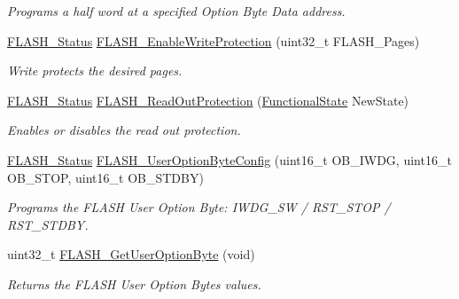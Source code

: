 \begin{DoxyCompactItemize}
\begin{DoxyCompactList}\small\item\em Programs a half word at a specified Option Byte Data address. \end{DoxyCompactList}\item 
\hyperlink{group___f_l_a_s_h___exported___types_gadc63a6f3404ff1f71229a66915e9cdc0}{F\+L\+A\+S\+H\+\_\+\+Status} \hyperlink{group___f_l_a_s_h___exported___functions_gabad10c15e2d1ff1cb9e1083d08a9e763}{F\+L\+A\+S\+H\+\_\+\+Enable\+Write\+Protection} (uint32\+\_\+t F\+L\+A\+S\+H\+\_\+\+Pages)
\begin{DoxyCompactList}\small\item\em Write protects the desired pages. \end{DoxyCompactList}\item 
\hyperlink{group___f_l_a_s_h___exported___types_gadc63a6f3404ff1f71229a66915e9cdc0}{F\+L\+A\+S\+H\+\_\+\+Status} \hyperlink{group___f_l_a_s_h___exported___functions_ga0b8d1a8277950c890bbc247bbeafb40f}{F\+L\+A\+S\+H\+\_\+\+Read\+Out\+Protection} (\hyperlink{group___exported__types_gac9a7e9a35d2513ec15c3b537aaa4fba1}{Functional\+State} New\+State)
\begin{DoxyCompactList}\small\item\em Enables or disables the read out protection. \end{DoxyCompactList}\item 
\hyperlink{group___f_l_a_s_h___exported___types_gadc63a6f3404ff1f71229a66915e9cdc0}{F\+L\+A\+S\+H\+\_\+\+Status} \hyperlink{group___f_l_a_s_h___exported___functions_gaae1c493bb06c930ceb84dedfdb7325f6}{F\+L\+A\+S\+H\+\_\+\+User\+Option\+Byte\+Config} (uint16\+\_\+t O\+B\+\_\+\+I\+W\+DG, uint16\+\_\+t O\+B\+\_\+\+S\+T\+OP, uint16\+\_\+t O\+B\+\_\+\+S\+T\+D\+BY)
\begin{DoxyCompactList}\small\item\em Programs the F\+L\+A\+SH User Option Byte\+: I\+W\+D\+G\+\_\+\+SW / R\+S\+T\+\_\+\+S\+T\+OP / R\+S\+T\+\_\+\+S\+T\+D\+BY. \end{DoxyCompactList}\item 
uint32\+\_\+t \hyperlink{group___f_l_a_s_h___exported___functions_ga31441647fac5fbb38369613076737943}{F\+L\+A\+S\+H\+\_\+\+Get\+User\+Option\+Byte} (void)
\begin{DoxyCompactList}\small\item\em Returns the F\+L\+A\+SH User Option Bytes values. \end{DoxyCompactList}\item 

\end{DoxyCompactItemize}
